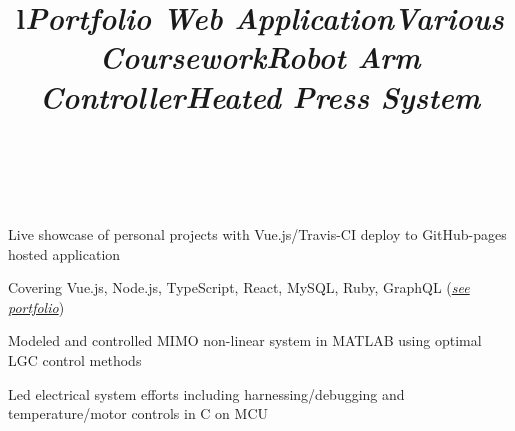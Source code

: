 \documentclass[mm]{res}
\begin{document}
\begin{resume}

\toprule

\section{\headingprojects}
\begin{format}
\title{l}\\
\body\\
\end{format}


\title{\textsl{Portfolio Web Application}}
\begin{position}
\tb Live showcase of personal projects with Vue.js/Travis-CI deploy to GitHub-pages hosted application
\end{position}

\title{\textsl{Various Coursework}}
\begin{position}
\tb Covering Vue.js, Node.js, TypeScript, React, MySQL, Ruby, GraphQL (\textsl{\href{\myport}{see portfolio}})
\end{position}


\title{\textsl{Robot Arm Controller}}
\begin{position}
\tb Modeled and controlled MIMO non-linear system in MATLAB using optimal LGC control methods
\end{position}

\title{\textsl{Heated Press System}}
\begin{position}
\tb Led electrical system efforts including harnessing/debugging and temperature/motor controls in C on MCU
\end{position}



\end{resume}
\end{document}
